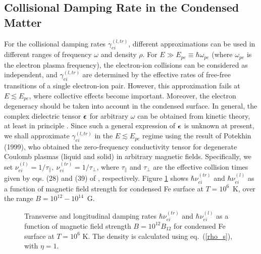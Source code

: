 \documentclass{emulateapj}
\newcommand{\beps}{{\mbox{\boldmath $\epsilon$}}}
\begin{document}

\subsection{Collisional Damping Rate in the Condensed Matter}
\label{sect:Damping}

For the collisional damping rates $\gamma^{(l,tr)}_{ei}$,
different approximations can be used in different ranges of
frequency $\omega$ and density $\rho$.
For $E\gg E_{pe} \equiv \hbar\omega_{pe}$ (where $\omega_{pe}$
is the electron plasma frequency),
the electron-ion collisions can be considered as independent, and
$\gamma^{(l,tr)}_{ei}$ are determined by the effective
rates of free-free transitions of a single electron-ion pair.
However, this approximation fails at $E\lesssim E_{pe}$, where
collective effects become important.
Moreover, the electron degeneracy should be taken into account
in the condensed surface.
In general, the complex dielectric tensor $\beps$ for arbitrary 
$\omega$ can be obtained from kinetic theory, at least in principle
\citep[e.g., see][]{Ginzburg}. Since such a general expression of
$\beps$ is unknown at present, we shall approximate $\gamma^{(l,tr)}_{ei}$ 
in the $E\lesssim E_{pe}$ regime using the result of 
Potekhin (1999), who obtained the zero-frequency
conductivity tensor for degenerate Coulomb plasmas (liquid and solid)
in arbitrary magnetic fields. Specifically, we set 
$\nu^{(l)}_{ei}=1/\tau_\|,~\nu^{(tr)}_{ei}=1/\tau_\perp$,
where $\tau_\|$ and $\tau_\perp$ are the effective collision times
given by eqs. (28) and (39) of \citet{P99}, respectively.
Figure \ref{fig1} shows $\hbar \nu_{ei}^{(tr)}$ and $\hbar \nu_{ei}^{(l)}$ 
as a function of magnetic field strength
for condensed Fe surface at $T=10^6$~K, over the range 
$B=10^{12}-10^{14}$~G.

\begin{figure}
\caption{Transverse and longitudinal damping rates $\hbar \nu_{ei}^{(tr)}$ and 
$\hbar \nu_{ei}^{(l)}$ as a function of magnetic field strength $B=10^{12} B_{12}$ for condensed 
Fe surface at $T=10^6$ K.  
The density is calculated using eq.~(\ref{rho_s}), with 
$\eta=1$. 
}
\label{fig1}
\end{figure}
\end{document}
